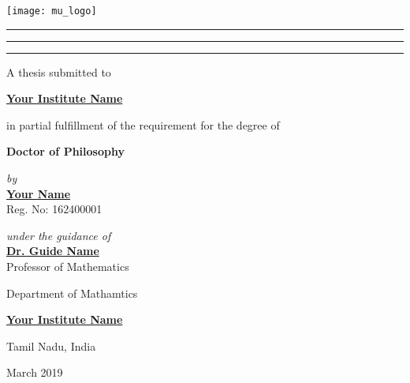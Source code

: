 

\begin{titlepage}
\centering

\texttt{[image: mu\_logo]}




\vspace{1.5cm}
{\color{sec}
\hrule height 2pt
\bigskip

\LARGE \bfseries 

\printtitle 

\bigskip
\hrule height 1pt
\vspace{0.2mm}
\hrule height 2pt
}

\vspace{1.5cm}

A thesis submitted to

\bigskip

\href{https://your-institue-url/}{\bfseries \large  Your Institute Name}

\bigskip

in partial fulfillment of the requirement for the degree of
\bigskip

{\bfseries \large  \color{sec} Doctor of Philosophy} 

\bigskip

{
	\emph{by} \\
	\bigskip
	\href{https://your-profile-url/}{\bfseries \large  Your Name} \\
	Reg. No: 162400001
}

\vspace{2\baselineskip}

{
\emph{under the guidance of} \\
\bigskip
\href{https://guide-profile-url}{\bfseries\large   Dr. Guide Name} \\
Professor of Mathematics \\

}


\vspace{2\baselineskip}



\vfill 
Department of Mathamtics 

\href{https://institute-url/}{\bfseries Your Institute Name}

Tamil Nadu, India

\bigskip

{\large March 2019}
\vspace{0.5cm}

\end{titlepage}


